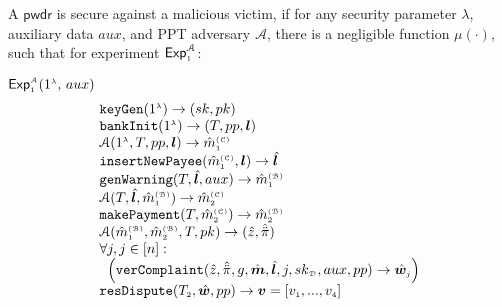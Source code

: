 \begin{definition}\label{def-a::Security-against-malicious-victim} A $\mathsf{pwdr}$  is secure against a malicious victim, if for any security parameter $\lambda$,  auxiliary data $aux$, and   PPT adversary $\mathcal{A}$, there is a negligible function $\mu(\cdot)$, such that for  experiment $\mathsf{Exp}_{\scriptscriptstyle 1}^{\mathcal{A}}$:
%


\vspace{-.7mm}

{\small{
\begin{center}
\begin{mybox}[colback=white,  width=81mm, height=51mm, left=.3mm, drop fuzzy shadow southwest]{{{$\mathsf{Exp}_{\scriptscriptstyle 1}^{\scriptscriptstyle\mathcal{A}}(1^{\scriptscriptstyle\lambda}\text{, }  
{aux})$}}}
%
\vspace{-.7mm}
$$
  \begin{array}{l}
    \mathtt{keyGen}(1^{\st\lambda})\rightarrow (sk,pk)\\
  \mathtt{bankInit}(1^{\st \lambda})\rightarrow (T, pp, \bm{l}) \\
      \mathcal{A}( 1^{\st \lambda}, T, pp, \bm{l} )\rightarrow \hat m^{\st\mathcal{(C)}}_{\st 1} \\
%   
\mathtt{insertNewPayee}(\hat{m}^{\st\mathcal{(C)}}_{\st 1}, {\bm l})\rightarrow \hat{\bm l} \\
%
\mathtt{genWarning}(T, \hat{\bm l}, {aux})\rightarrow \hat m^{\st\mathcal{(B)}}_{\st1} \\
%
   \mathcal{A}(T,  \hat{\bm{l}}, \hat m^{\st\mathcal{(B)}}_{\st1})\rightarrow \hat m^{\st\mathcal{(C)}}_{\st2} \\
%
   \mathtt{makePayment}(T, \hat m^{\st\mathcal{(C)}}_{\st2})\rightarrow \hat m^{\st\mathcal{(B)}}_{\st2} \\
\mathcal{A}(\hat m^{\st\mathcal{(B)}}_{\st 1}, \hat m^{\st\mathcal{(B)}}_{\st2}, T, pk)\rightarrow (\hat z, \hat{\ddot \pi})\\
%
 \forall j, j\in [n]:\\
\hspace{2mm}\Big(\mathtt{verComplaint}( \hat z, \hat{\ddot{\pi}}, g, \hat{\bm{m}}, \hat{\bm{l}}, j, sk_{\st\mathcal D}, aux, pp)\rightarrow \hat{\bm{w}}_{\st j}%
\Big) \\
\mathtt{resDispute}(T_{\st 2}, \hat{\bm w}, pp)\rightarrow \bm v=[v_{\st 1},..., v_{\st 4}]
   \end{array} 
$$
\end{mybox}
%
\end{center}
}}



\end{definition}
